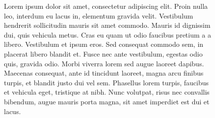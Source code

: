 \Conclusion %

\begin{figure}
Lorem ipsum dolor sit amet, consectetur adipiscing elit. Proin nulla leo, interdum eu lacus in, elementum gravida velit. Vestibulum hendrerit sollicitudin mauris sit amet commodo. Mauris id dignissim dui, quis vehicula metus. Cras eu quam ut odio faucibus pretium a a libero. Vestibulum et ipsum eros. Sed consequat commodo sem, in placerat libero blandit et. Fusce nec ante vestibulum, egestas odio quis, gravida odio. Morbi viverra lorem sed augue laoreet dapibus. Maecenas consequat, ante id tincidunt laoreet, magna arcu finibus turpis, et blandit justo dui vel sem. Phasellus lorem turpis, faucibus et vehicula eget, tristique at nibh. Nunc volutpat, risus nec convallis bibendum, augue mauris porta magna, sit amet imperdiet est dui et lacus.
\end{figure}
